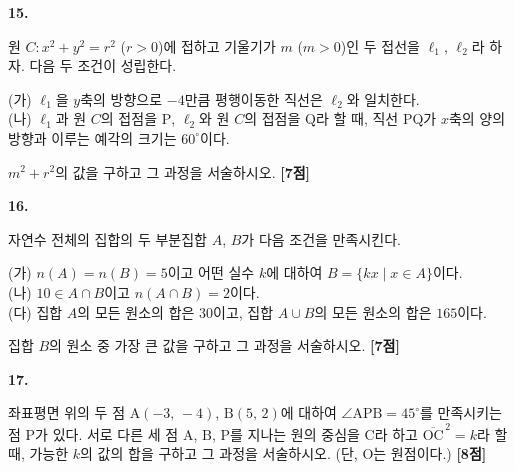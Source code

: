 \documentclass[10pt]{article}
\renewenvironment{problem}[2]{%
  \par%
  \setcounter{probnum}{#1}%
  \noindent
  \begin{minipage}[t]{\linewidth}%
  \setlength{\parskip}{4pt plus 1pt}%
  {\sffamily\bfseries\large\color{black}#1.}\par\smallskip\ignorespaces
}{%
  \end{minipage}\par%
}
\newcommand{\pts}[1]{\nobreak\hspace*{\fill}\textbf{[#1점]}\par}
\begin{document}
\begin{pagepair}
\noindent
\begin{minipage}[t]{0.46\linewidth}\raggedright
\begin{problem}{15}{s}
원 $C: x^{2}+y^{2}=r^{2}$ ($r>0$)에 접하고 기울기가 $m$ ($m>0$)인 두 접선을 $\ell_{1}$, $\ell_{2}$라 하자. 다음 두 조건이 성립한다.
\begin{conditions}
(가) $\ell_{1}$을 $y$축의 방향으로 $-4$만큼 평행이동한 직선은 $\ell_{2}$와 일치한다. \\[3pt]
(나) $\ell_{1}$과 원 $C$의 접점을 $\mathrm{P}$, $\ell_{2}$와 원 $C$의 접점을 $\mathrm{Q}$라 할 때, 직선 $\mathrm{PQ}$가 $x$축의 양의 방향과 이루는 예각의 크기는 $60^\circ$이다.
\end{conditions}
$m^{2}+r^{2}$의 값을 구하고 그 과정을 서술하시오. \pts{7}

\vspace{45mm}
\end{problem}
\end{minipage}\hfill\begin{minipage}[t]{0.46\linewidth}\raggedright
\begin{problem}{16}{s}
자연수 전체의 집합의 두 부분집합 $A$, $B$가 다음 조건을 만족시킨다.
\begin{conditions}
(가) $n(A)=n(B)=5$이고 어떤 실수 $k$에 대하여 $B=\{kx\mid x\in A\}$이다. \\[3pt]
(나) $10\in A\cap B$이고 $n(A\cap B)=2$이다. \\[3pt]
(다) 집합 $A$의 모든 원소의 합은 $30$이고, 집합 $A\cup B$의 모든 원소의 합은 $165$이다.
\end{conditions}
집합 $B$의 원소 중 가장 큰 값을 구하고 그 과정을 서술하시오. \pts{7}

\vspace{45mm}
\end{problem}
\end{minipage}
\end{pagepair}


\noindent
\begin{minipage}[t]{0.46\linewidth}\raggedright
\begin{problem}{17}{s}
좌표평면 위의 두 점 $\mathrm{A}(-3,\,-4)$, $\mathrm{B}(5,\,2)$에 대하여 $\angle \mathrm{APB}=45^\circ$를 만족시키는 점 $\mathrm{P}$가 있다. 서로 다른 세 점 $\mathrm{A}$, $\mathrm{B}$, $\mathrm{P}$를 지나는 원의 중심을 $\mathrm{C}$라 하고 $\overline{\mathrm{OC}}^{\,2}=k$라 할 때, 가능한 $k$의 값의 합을 구하고 그 과정을 서술하시오. (단, $\mathrm{O}$는 원점이다.) \pts{8}

\vspace{150mm}
\end{problem}
\end{minipage}\hfill\begin{minipage}[t]{0.46\linewidth}\raggedright
\vspace{170mm}
\end{minipage}
\end{document}
